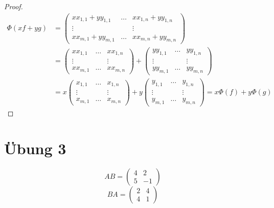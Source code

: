 \documentclass[a4paper,10pt]{article}
\begin{document}
\begin{proof}
 \begin{align*}
  \Phi(xf + yg) & = \begin{pmatrix}
                   xx_{1,1} + yy_{1,1} & \dots & xx_{1,n} + yy_{1,n}\\
                   \vdots & & \vdots\\
                   xx_{m,1} + yy_{m,1} & \dots & xx_{m,n} + yy_{m,n}
                  \end{pmatrix}\\
              & = \begin{pmatrix}
                   xx_{1,1} & \dots & xx_{1,n}\\
                   \vdots & & \vdots\\
                   xx_{m,1} & \dots & xx_{m,n}
                  \end{pmatrix}
                + \begin{pmatrix}
                   yy_{1,1} & \dots & yy_{1,n}\\
                   \vdots & & \vdots\\
                   yy_{m,1} & \dots & yy_{m,n}
                  \end{pmatrix}\\
              & = x\begin{pmatrix}
                   x_{1,1} & \dots & x_{1,n}\\
                   \vdots & & \vdots\\
                   x_{m,1} & \dots & x_{m,n}
                  \end{pmatrix}
                + y\begin{pmatrix}
                   y_{1,1} & \dots & y_{1,n}\\
                   \vdots & & \vdots\\
                   y_{m,1} & \dots & y_{m,n}
                  \end{pmatrix}
 = x\Phi(f) + y\Phi(g)
 \end{align*}
\end{proof}

\section*{Übung 3}

\begin{equation}
 AB = \begin{pmatrix}
       4 & 2\\
       5 & -1
      \end{pmatrix}
\end{equation}
\begin{equation}
 BA = \begin{pmatrix}
       2 & 4\\
       4 & 1
      \end{pmatrix}
\end{equation}
\end{document}

